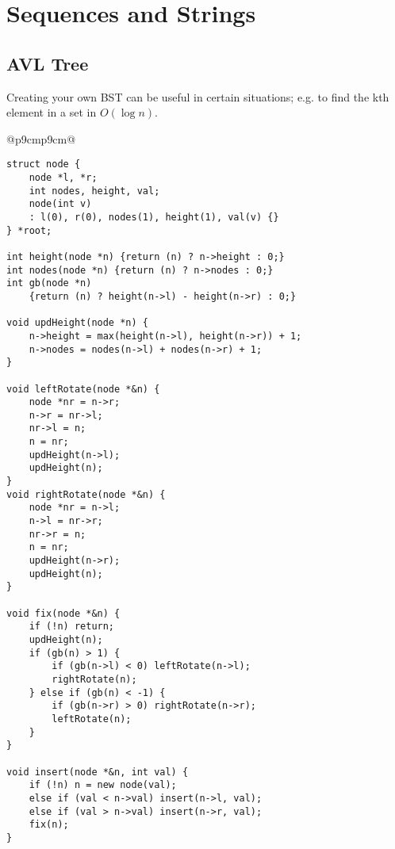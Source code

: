 \documentclass[letterpaper]{article}
\begin{document}
\clearpage

\section{Sequences and Strings}

\subsection {AVL Tree}

Creating your own BST can be useful in certain situations; e.g. to find the kth element in a set in $O\left(\log n\right)$.

\begin{tabular}{@{}p{9cm}p{9cm}@{}}
\begin{lstlisting}
struct node {
	node *l, *r;
	int nodes, height, val;
	node(int v)
	: l(0), r(0), nodes(1), height(1), val(v) {}
} *root;

int height(node *n) {return (n) ? n->height : 0;}
int nodes(node *n) {return (n) ? n->nodes : 0;}
int gb(node *n)
	{return (n) ? height(n->l) - height(n->r) : 0;}

void updHeight(node *n) {
	n->height = max(height(n->l), height(n->r)) + 1;
	n->nodes = nodes(n->l) + nodes(n->r) + 1;
}

void leftRotate(node *&n) {
	node *nr = n->r;
	n->r = nr->l;
	nr->l = n;
	n = nr;
	updHeight(n->l);
	updHeight(n);
}
void rightRotate(node *&n) {
	node *nr = n->l;
	n->l = nr->r;
	nr->r = n;
	n = nr;
	updHeight(n->r);
	updHeight(n);
}

void fix(node *&n) {
	if (!n) return;
	updHeight(n);
	if (gb(n) > 1) {
		if (gb(n->l) < 0) leftRotate(n->l);
		rightRotate(n);
	} else if (gb(n) < -1) {
		if (gb(n->r) > 0) rightRotate(n->r);
		leftRotate(n);
	}
}

void insert(node *&n, int val) {
	if (!n) n = new node(val);
	else if (val < n->val) insert(n->l, val);
	else if (val > n->val) insert(n->r, val);
	fix(n);
}


\end{lstlisting}
\end{tabular}
\end{document}
